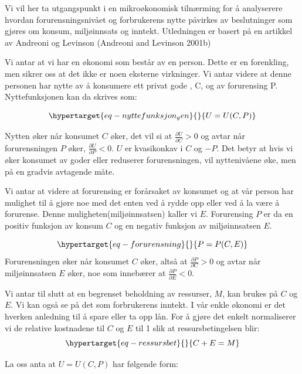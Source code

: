 \documentclass[
  12pt,
  letterpaper,
  DIV=11,
  numbers=noendperiod]{scrartcl}
\begin{document}
Vi vil her ta utgangspunkt i en mikroøkonomisk tilnærming for å
analyserere hvordan forurensningsnivået og forbrukerens nytte påvirkes
av beslutninger som gjøres om konsum, miljøinnsats og inntekt.
Utledningen er basert på en artikkel av Andreoni og Levinson (Andreoni
and Levinson 2001b)

Vi antar at vi har en økonomi som består av en person. Dette er en
forenkling, men sikrer oss at det ikke er noen eksterne virkninger. Vi
antar videre at denne personen har nytte av å konsumere ett privat gode
, C, og av forurensing P. Nyttefunksjonen kan da skrives som:

\begin{equation}\protect\hypertarget{eq-nyttefunksjon_gen}{}{
U=U(C,P)
}\label{eq-nyttefunksjon_gen}\end{equation}

Nytten øker når konsumet \(C\) øker, det vil si at
\(\frac{\partial U}{\partial C}>0\) og avtar når forurensningen \(P\)
øker, \(\frac{\partial U}{\partial P}<0\). \(U\) er kvasikonkav i \(C\)
og \(-P\). Det betyr at hvis vi øker konsumet av goder eller reduserer
forurensningen, vil nyttenivåene øke, men på en gradvis avtagende måte.

Vi antar at videre at forurensing er forårsaket av konsumet og at vår
person har mulighet til å gjøre noe med det enten ved å rydde opp eller
ved å la være å forurense. Denne muligheten(miljøinnsatsen) kaller vi
\(E\). Forurensing \(P\) er da en positiv funksjon av konsum \(C\) og en
negativ funksjon av miljøinnsatsen \(E\).

\begin{equation}\protect\hypertarget{eq-forurensning}{}{P=P(C,E)}\label{eq-forurensning}\end{equation}
Forurensningen øker når konsumet \(C\) øker, altså at
\(\frac{\partial P}{\partial C}>0\) og avtar når miljøinnsatsen \(E\)
øker, noe som innebærer at \(\frac{\partial P}{\partial E}<0\).

Vi antar til slutt at en begrenset beholdning av ressurser, \(M\), kan
brukes på \(C\) og \(E\). Vi kan også se på det som forbrukerens
inntekt. I vår enkle økonomi er det hverken anledning til å spare eller
ta opp lån. For å gjøre det enkelt normaliserer vi de relative
kostnadene til \(C\) og \(E\) til 1 slik at ressursbetingelsen blir:
\begin{equation}\protect\hypertarget{eq-ressursbet}{}{C+E=M}\label{eq-ressursbet}\end{equation}

La oss anta at \(U=U(C,P)\) har følgende form:
\end{document}
